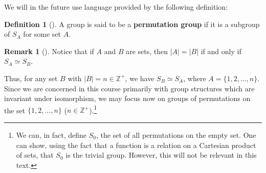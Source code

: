 \documentclass[10pt,]{book}
\newcommand{\terminology}[1]{\textbf{#1}}
\theoremstyle{plain}
\theoremstyle{definition}
\newtheorem{definition}[theorem]{Definition}
\theoremstyle{definition}
\newtheorem{remark}[theorem]{Remark}
\theoremstyle{definition}
\theoremstyle{definition}
\numberwithin{equation}{section}
\def\Z{\mathbb{Z}}
\begin{document}
We will in the future use language provided by the following definition:%
\begin{definition}[{}]\label{definition-44}
A group is said to be a \terminology{permutation group} if it is a subgroup of \(S_A\) for some set \(A\).%
\end{definition}
\begin{remark}[]\label{remark-23}
Notice that if \(A\) and \(B\) are sets, then \(|A|=|B|\) if and only if \(S_A\simeq S_B\).%
\end{remark}
Thus, for any set \(B\) with \(|B|=n \in \Z^+\), we have \(S_B\simeq
S_A\), where \(A=\{1,2,\ldots,n\}\). Since we are concerned in this course primarily with group structures which are invariant under isomorphism, we may focus now on groups of permutations on the set \(\{1,2,\ldots, n\}\) (\(n\in \Z^+\)).\footnote{We can, in fact,  define \(S_0\), the set of all permutations on the empty set. One can show, using the fact that a function is a relation on a Cartesian product of sets, that \(S_0\) is the trivial group. However, this will not be relevant in this text.\label{fn-4}}%
\typeout{************************************************}
\typeout{************************************************}
\end{document}
